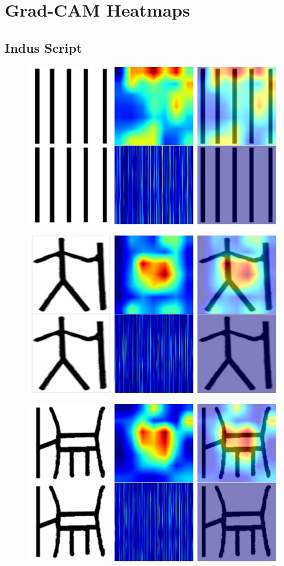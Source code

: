 \documentclass[11pt,a4paper,oneside]{report}
\begin{document}
\section{Grad-CAM Heatmaps}
\label{app: gradcam}

\subsection{Indus Script}
 \begin{figure}[H]
    \centering
    \includegraphics[width=0.9\linewidth]{Visualizations/Grad-CAM/Indus/gradcam_35_combined.pdf}
\end{figure}

 \begin{figure}[H]
    \centering
    \includegraphics[width=0.9\linewidth]{Visualizations/Grad-CAM/Indus/gradcam_142_combined.pdf}
\end{figure}

 \begin{figure}[H]
    \centering
    \includegraphics[width=0.9\linewidth]{Visualizations/Grad-CAM/Indus/gradcam_321_combined.pdf}
\end{figure}
\end{document}
